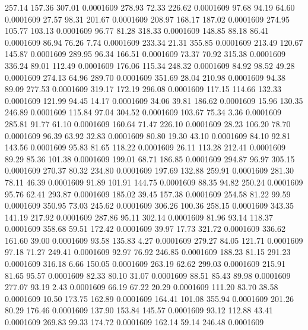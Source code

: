  257.14  157.36  307.01   0.0001609
 278.93   72.33  226.62   0.0001609
  97.68   94.19   64.60   0.0001609
  27.57   98.31  201.67   0.0001609
 208.97  168.17  187.02   0.0001609
 274.95  105.77  103.13   0.0001609
  96.77   81.28  318.33   0.0001609
 148.85   88.18   86.41   0.0001609
  86.94   76.26    7.74   0.0001609
 233.34   21.31  355.85   0.0001609
 213.49  120.67  145.87   0.0001609
 289.95   96.34  166.51   0.0001609
  73.37   70.92  315.38   0.0001609
 336.24   89.01  112.49   0.0001609
 176.06  115.34  248.32   0.0001609
  84.92   98.52   49.28   0.0001609
 274.13   64.96  289.70   0.0001609
 351.69   28.04  210.98   0.0001609
  94.38   89.09  277.53   0.0001609
 319.17  172.19  296.08   0.0001609
 117.15  114.66  132.33   0.0001609
 121.99   94.45   14.17   0.0001609
  34.06   39.81  186.62   0.0001609
  15.96  130.35  246.89   0.0001609
 115.84   97.04  304.52   0.0001609
 103.67   75.34    3.36   0.0001609
 285.81   91.77   61.10   0.0001609
 160.64   71.47  226.10   0.0001609
  28.23  106.20   78.70   0.0001609
  96.39   63.92   32.83   0.0001609
  80.80   19.30   43.10   0.0001609
  84.10   92.81  143.56   0.0001609
  95.83   81.65  118.22   0.0001609
  26.11  113.28  212.41   0.0001609
  89.29   85.36  101.38   0.0001609
 199.01   68.71  186.85   0.0001609
 294.87   96.97  305.15   0.0001609
 270.37   80.32  234.80   0.0001609
 197.69  132.88  259.91   0.0001609
 281.30   78.11   46.39   0.0001609
  91.89  101.91  144.75   0.0001609
  88.35   94.82  250.24   0.0001609
  95.76   62.41  293.87   0.0001609
 185.02   39.45  157.38   0.0001609
 254.58   81.22   99.59   0.0001609
 350.95   73.03  245.62   0.0001609
 306.26  100.36  258.15   0.0001609
 343.35  141.19  217.92   0.0001609
 287.86   95.11  302.14   0.0001609
  81.96   93.14  118.37   0.0001609
 358.68   59.51  172.42   0.0001609
  39.97   17.73  321.72   0.0001609
 336.62  161.60   39.00   0.0001609
  93.58  135.83    4.27   0.0001609
 279.27   84.05  121.71   0.0001609
  97.18   71.27  249.41   0.0001609
  92.97   76.92  246.85   0.0001609
 188.23   81.15  291.23   0.0001609
 316.18    6.66  150.05   0.0001609
 263.19   62.62  299.03   0.0001609
 215.91   81.65   95.57   0.0001609
  82.33   80.10   31.07   0.0001609
  88.51   85.43   89.98   0.0001609
 277.07   93.19    2.43   0.0001609
  66.19   67.22   20.29   0.0001609
 111.20   83.70   38.58   0.0001609
  10.50  173.75  162.89   0.0001609
 164.41  101.08  355.94   0.0001609
 201.26   80.29  176.46   0.0001609
 137.90  153.84  145.57   0.0001609
  93.12  112.88   43.41   0.0001609
 269.83   99.33  174.72   0.0001609
 162.14   59.14  246.48   0.0001609
